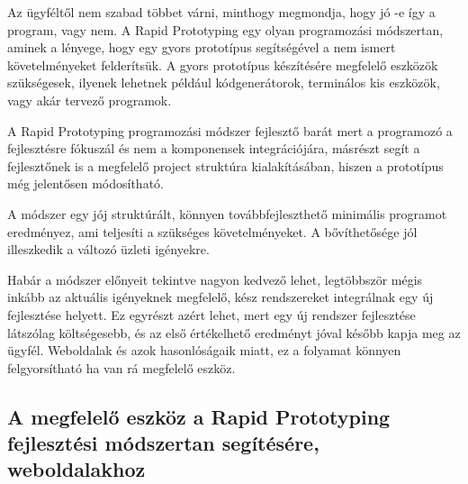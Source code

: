 \documentclass[a4paper,12pt,oneside]{report}
\begin{document}
\begin{justify}

	Az ügyféltől nem szabad többet várni, minthogy megmondja, hogy jó -e így a program, vagy nem. A Rapid Prototyping egy olyan programozási módszertan, aminek a lényege, hogy egy gyors prototípus segítségével a nem ismert követelményeket felderítsük. A gyors prototípus készítésére megfelelő eszközök szükségesek, ilyenek lehetnek például kódgenerátorok, terminálos kis eszközök, vagy akár tervező programok. \cite{website:rapid_prototype}

	A Rapid Prototyping programozási módszer fejlesztő barát mert a programozó a fejlesztésre fókuszál és nem a komponensek integrációjára, másrészt segít a fejlesztőnek is a megfelelő project struktúra kialakításában, hiszen a prototípus még jelentősen módosítható.

	A módszer egy jój struktúrált, könnyen továbbfejleszthető minimális programot eredményez, ami teljesíti a szükséges követelményeket. A bővíthetősége jól illeszkedik a változó üzleti igényekre. 

	Habár a módszer előnyeit tekintve nagyon kedvező lehet, legtöbbször mégis inkább az aktuális igényeknek megfelelő, kész rendszereket integrálnak egy új fejlesztése helyett. Ez egyrészt azért lehet, mert egy új rendszer fejlesztése látszólag költségesebb, és az első értékelhető eredményt jóval később kapja meg az ügyfél. Weboldalak és azok hasonlóságaik miatt, ez a folyamat könnyen felgyorsítható ha van rá megfelelő eszköz.

\end{justify}

\newpage
\subsection{A megfelelő eszköz a Rapid Prototyping fejlesztési módszertan segítésére, weboldalakhoz }
\end{document}

